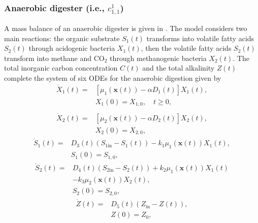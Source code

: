 \documentclass[lettersize,journal]{IEEEtran}
\begin{document}
\subsubsection{Anaerobic digester (i.e., $c^1_{1,1}$)} 
A mass balance of an anaerobic digester is given in \cite{bernard2001dynamical,campos2019hybrid}. The model considers two main reactions: the organic substrate $S_1(t)$ transforms into volatile fatty acids $S_2(t)$ through acidogenic bacteria $X_1(t)$, then the volatile fatty acids $S_2(t)$ transform into methane and $\text{CO}_2$ through methanogenic bacteria $X_2(t)$. The total inorganic carbon concentration $C(t)$ and the total alkalinity $Z(t)$ complete the system of six ODEs for the anaerobic digestion given by       
\begin{equation}
\begin{aligned}
\dot{X}_1(t) = {} & \left[\mu_1(\bm{x}(t)) - \alpha D_1(t)\right]X_1(t), \label{eq:digester1}\\
& X_1(0) = X_{1,0}, \quad t \geq 0,\\
\end{aligned}
\end{equation}
\begin{equation}
\begin{aligned}
\dot{X}_2(t) = {} & \left[\mu_2(\bm{x}(t)) - \alpha D_2(t)\right]X_2(t), \label{eq:digester2}\\
& X_2(0) = X_{2,0},
\end{aligned}
\end{equation}
\begin{equation}
\begin{aligned}
\dot{S}_1(t) = {} & D_3(t) \left(S_{1\text{in}} - S_1(t)\right) - k_1 \mu_1(\bm{x}(t))X_1(t), \label{eq:digester3}\\
& S_1(0) = S_{1,0},
\end{aligned}
\end{equation}
\begin{equation}
\begin{aligned}
\dot{S}_2(t) = {} & D_4(t) \left(S_{2\text{in}} - S_2(t)\right) + k_2 \mu_1(\bm{x}(t))X_1(t) \\
& - k_3 \mu_2(\bm{x}(t))X_2(t), \label{eq:digester4}\\
& S_2(0) = S_{2,0},
\end{aligned}
\end{equation}
\begin{equation}
\begin{aligned}
\dot{Z}(t) = {} & D_5(t) \left(Z_{\text{in}} - Z(t)\right), \label{eq:digester5}\\
& Z(0) = Z_0,
\end{aligned}
\end{equation}
\end{document}
